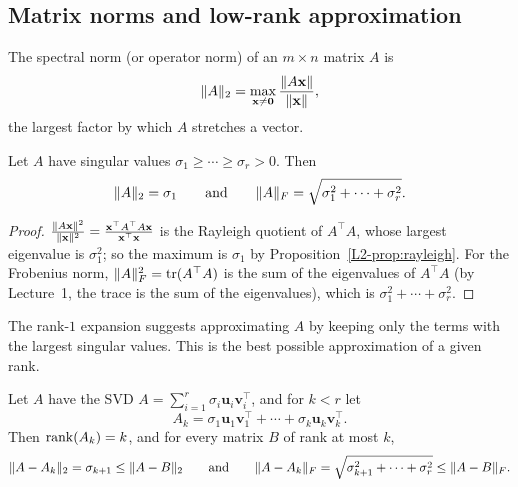 \subsection{Matrix norms and low-rank approximation}

\begin{definition}
    The spectral norm (or operator norm) of an $m \times n$ matrix $A$ is
    \[\lVert A \rVert_2 = \max_{\mathbf{x} \neq \mathbf{0}} \frac{\lVert A\mathbf{x} \rVert}{\lVert \mathbf{x} \rVert},\]
    the largest factor by which $A$ stretches a vector.
\end{definition}

\begin{proposition}\label{L2-prop:matrix-norms}
    Let $A$ have singular values $\sigma_1 \geq \cdots \geq \sigma_r > 0$. Then
    \[\lVert A \rVert_2 = \sigma_1 \qquad \text{and} \qquad \lVert A \rVert_F = \sqrt{\sigma_1^2 + \cdots + \sigma_r^2}.\]
\end{proposition}

\begin{proof}
    $\frac{\lVert A\mathbf{x} \rVert^2}{\lVert \mathbf{x} \rVert^2} = \frac{\mathbf{x}^\top A^\top A \mathbf{x}}{\mathbf{x}^\top \mathbf{x}}$ is the Rayleigh quotient of $A^\top A$, whose largest eigenvalue is $\sigma_1^2$; so the maximum is $\sigma_1$ by Proposition~\ref{L2-prop:rayleigh}. For the Frobenius norm, $\lVert A \rVert_F^2 = \operatorname{tr}(A^\top A)$ is the sum of the eigenvalues of $A^\top A$ (by Lecture~1, the trace is the sum of the eigenvalues), which is $\sigma_1^2 + \cdots + \sigma_r^2$.
\end{proof}

The rank-$1$ expansion suggests approximating $A$ by keeping only the terms with the largest singular values. This is the best possible approximation of a given rank.

\begin{theorem}\label{L2-thm:eckart-young}
    Let $A$ have the SVD $A = \sum_{i=1}^r \sigma_i \mathbf{u}_i \mathbf{v}_i^\top$, and for $k < r$ let
    \[A_k = \sigma_1 \mathbf{u}_1 \mathbf{v}_1^\top + \cdots + \sigma_k \mathbf{u}_k \mathbf{v}_k^\top.\]
    Then $\operatorname{rank}(A_k) = k$, and for every matrix $B$ of rank at most $k$,
    \[\lVert A - A_k \rVert_2 = \sigma_{k+1} \leq \lVert A - B \rVert_2 \qquad \text{and} \qquad \lVert A - A_k \rVert_F = \sqrt{\sigma_{k+1}^2 + \cdots + \sigma_r^2} \leq \lVert A - B \rVert_F.\]
\end{theorem}

